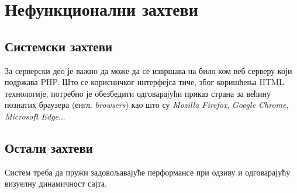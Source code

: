 \section{Нефункционални захтеви}

\subsection{Системски захтеви}

За серверски део је важно да може да се извршава на било ком веб-серверу који подржава PHP.
Што се корисничког интерфејса тиче, због коришћења HTML технологије, потребно је обезбедити одговарајући
приказ страна за већину познатих браузера (енгл. \textit{browsers}) као што су \textit{Mozilla Firefox},
\textit{Google Chrome}, \textit{Microsoft Edge}...

\subsection{Остали захтеви}

Систем треба да пружи задовољавајуће перформансе при одзиву и одговарајућу визуелну динамичност сајта.
